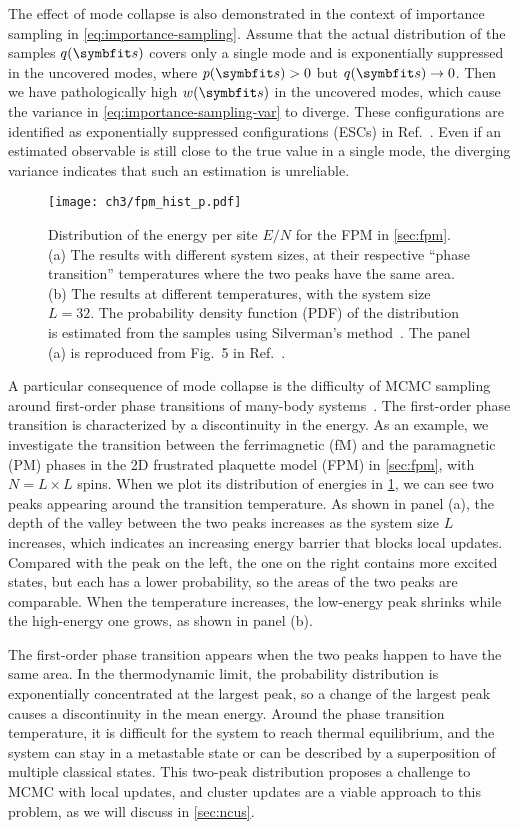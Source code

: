 The effect of mode collapse is also demonstrated in the context of importance sampling in \cref{eq:importance-sampling}. Assume that the actual distribution of the samples $q(\vs)$ covers only a single mode and is exponentially suppressed in the uncovered modes, where $p(\vs) > 0$ but $q(\vs) \to 0$. Then we have pathologically high $w(\vs)$ in the uncovered modes, which cause the variance in \cref{eq:importance-sampling-var} to diverge. These configurations are identified as exponentially suppressed configurations (ESCs) in Ref.~\cite{wu2021unbiased}. Even if an estimated observable is still close to the true value in a single mode, the diverging variance indicates that such an estimation is unreliable.

\begin{figure}[htb]
\centering
\texttt{[image: ch3/fpm\_hist\_p.pdf]}
\caption[Distribution of energy for FPM with different sizes and temperatures]{
Distribution of the energy per site $E / N$ for the FPM in \cref{sec:fpm}.
(a) The results with different system sizes, at their respective ``phase transition'' temperatures where the two peaks have the same area.
(b) The results at different temperatures, with the system size $L = 32$.
The probability density function (PDF) of the distribution is estimated from the samples using Silverman’s method~\cite{silverman1986density}.
The panel (a) is reproduced from Fig.~5 in Ref.~\cite{wu2021unbiased}.
}
\label{fig:fpm-hist-p}
\end{figure}

A particular consequence of mode collapse is the difficulty of MCMC sampling around first-order phase transitions of many-body systems~\cite{binder1987theory}. The first-order phase transition is characterized by a discontinuity in the energy. As an example, we investigate the transition between the ferrimagnetic (fM) and the paramagnetic (PM) phases in the 2D frustrated plaquette model (FPM) in \cref{sec:fpm}, with $N = L \times L$ spins. When we plot its distribution of energies in \cref{fig:fpm-hist-p}, we can see two peaks appearing around the transition temperature. As shown in panel (a), the depth of the valley between the two peaks increases as the system size $L$ increases, which indicates an increasing energy barrier that blocks local updates. Compared with the peak on the left, the one on the right contains more excited states, but each has a lower probability, so the areas of the two peaks are comparable. When the temperature increases, the low-energy peak shrinks while the high-energy one grows, as shown in panel (b).

The first-order phase transition appears when the two peaks happen to have the same area. In the thermodynamic limit, the probability distribution is exponentially concentrated at the largest peak, so a change of the largest peak causes a discontinuity in the mean energy. Around the phase transition temperature, it is difficult for the system to reach thermal equilibrium, and the system can stay in a metastable state or can be described by a superposition of multiple classical states. This two-peak distribution proposes a challenge to MCMC with local updates, and cluster updates are a viable approach to this problem, as we will discuss in \cref{sec:ncus}.
